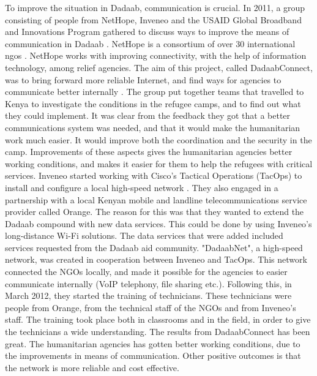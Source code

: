 To improve the situation in Dadaab, communication is crucial. In 2011, a group consisting of people from NetHope, Inveneo and the USAID Global Broadband and Innovations Program gathered to discuss ways to improve the means of communication in Dadaab \cite{dadaab}. NetHope is a consortium of over 30 international \glspl{ngo} \cite{nethope}. NetHope works with improving connectivity, with the help of information technology, among relief agencies. The aim of this project, called DadaabConnect, was to bring forward more reliable Internet, and find ways for agencies to communicate better internally \cite{dadaab}. The group put together teams that travelled to Kenya to investigate the conditions in the refugee camps, and to find out what they could implement. It was clear from the feedback they got that a better communications system was needed, and that it would make the humanitarian work much easier. It would improve both the coordination and the security in the camp. Improvements of these aspects gives the humanitarian agencies better working conditions, and makes it easier for them to help the refugees with critical services. Inveneo started working with Cisco's Tactical Operations (TacOps) to install and configure a local high-speed network \cite{dadaabinveneo}. They also engaged in a partnership with a local Kenyan mobile and landline telecommunications service provider called Orange. The reason for this was that they wanted to extend the Dadaab compound with new data services. This could be done by using Inveneo's long-distance Wi-Fi solutions. The data services that were added included services requested from the Dadaab aid community. "DadaabNet", a high-speed network, was created in cooperation between Inveneo and TacOps. This network connected the NGOs locally, and made it possible for the agencies to easier communicate internally (VoIP telephony, file sharing etc.). Following this, in March 2012, they started the training of technicians. These technicians were people from Orange, from the technical staff of the NGOs and from Inveneo's staff. The training took place both in classrooms and in the field, in order to give the technicians a wide understanding. The results from DadaabConnect has been great. The humanitarian agencies has gotten better working conditions, due to the improvements in means of communication. Other positive outcomes is that the network is more reliable and cost effective. 

